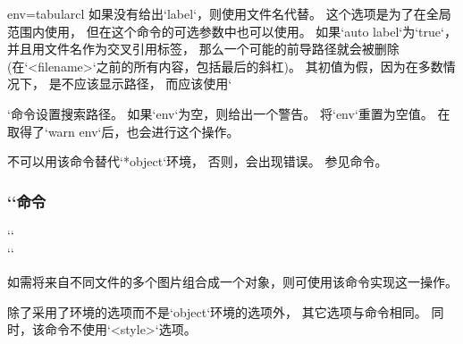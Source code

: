 \begin{tableobject}{env=tabular}{cl}
   如果没有给出`label`，则使用文件名代替。
   这个选项是为了在全局范围内使用，
   但在这个命令的可选参数中也可以使用。
   如果`auto label`为`true`，并且用文件名作为交叉引用标签，
   那么一个可能的前导路径就会被删除
   (在`<filename>`之前的所有内容，包括最后的斜杠)。
   其初值为假，因为在多数情况下，
   是不应该显示路径，
   而应该使用`\graphicspath{{path/}}`命令设置搜索路径。
   如果`env`为空，则给出一个警告。
   将`env`重置为空值。
   在取得了`warn env`后，也会进行这个操作。
\endkeydoc

不可以用该命令替代`*object`环境，
否则，会出现错误。
参见命令。
\endgroup

\subsubsection{``命令}
\label{includegraphicsubobject-command}
`` \\
``

如需将来自不同文件的多个图片组合成一个对象，则可使用该命令实现这一操作。

除了采用了环境的选项而不是`object`环境的选项外，
其它选项与命令相同。
同时，该命令不使用`<style>`选项。


\end{tableobject}
